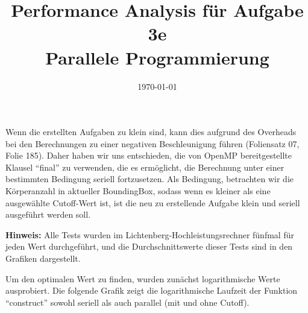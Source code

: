 \documentclass[
  ngerman,
  color=8c,
  submission,
  boxarc,
  fleqn,
]{rubos-tuda-template}
\date{\today}
\begin{document}
\title[Parallele Programmierung]{Performance Analysis für Aufgabe 3e\\ Parallele Programmierung}
\maketitle{}

Wenn die erstellten Aufgaben zu klein sind, kann dies aufgrund des Overheads bei den Berechnungen zu einer negativen Beschleunigung führen (Foliensatz 07, Folie 185). Daher haben wir uns entschieden, die von OpenMP bereitgestellte Klausel ``final'' zu verwenden, die es ermöglicht, die Berechnung unter einer bestimmten Bedingung seriell fortzusetzen. Als Bedingung, betrachten wir die Körperanzahl in aktueller BoundingBox, sodass wenn es kleiner als eine ausgewählte Cutoff-Wert ist, ist die neu zu erstellende Aufgabe klein und seriell ausgeführt werden soll.

\textbf{Hinweis:} Alle Tests wurden im Lichtenberg-Hochleistungsrechner fünfmal für jeden Wert durchgeführt, und die Durchschnittswerte dieser Tests sind in den Grafiken dargestellt.

Um den optimalen Wert zu finden, wurden zunächst logarithmische Werte ausprobiert. Die folgende Grafik zeigt die logarithmische Laufzeit der Funktion ``construct'' sowohl seriell als auch parallel (mit und ohne Cutoff).
\end{document}
